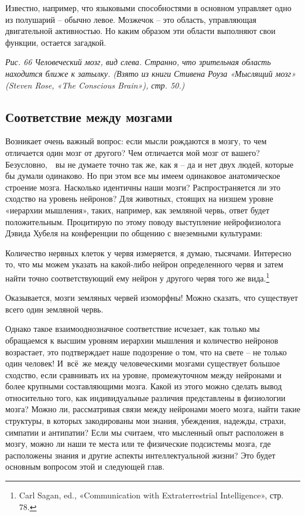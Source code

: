 \documentclass[../main.tex]{subfiles}
\begin{document}
Известно, например, что языковыми способностями в основном управляет одно из полушарий \--- обычно левое. Мозжечок \--- это область, управляющая двигательной активностью. Но каким образом эти области выполняют свои функции, остается загадкой.

\emph{Рис. 66 Человеческий мозг, вид слева. Странно, что зрительная область находится ближе к затылку. (Взято из книги Стивена Роуза «Мыслящий мозг» (Steven Rose, «The Conscious Brain»), стр. 50.)}


\subsection{Соответствие между мозгами}

Возникает очень важный вопрос: если мысли рождаются в мозгу, то чем отличается один мозг от другого? Чем отличается мой мозг от вашего? Безусловно,~~вы не думаете точно так же, как я \--- да и нет двух людей, которые бы думали одинаково. Но при этом все мы имеем одинаковое анатомическое строение мозга. Насколько идентичны наши мозги? Распространяется ли это сходство на уровень нейронов? Для животных, стоящих на низшем уровне «иерархии мышления», таких, например, как земляной червь, ответ будет положительным. Процитирую по этому поводу выступление нейрофизиолога Дэвида Хубеля на конференции по общению с внеземными культурами:

Количество нервных клеток у червя измеряется, я думаю, тысячами. Интересно то, что мы можем указать на какой-либо нейрон определенного червя и затем найти точно соответствующий ему нейрон у другого червя того же вида.\footnote{Carl Sagan, ed., «Communication with Extraterrestrial Intelligence», стр. 78.}

Оказывается, мозги земляных червей изоморфны! Можно сказать, что существует всего один земляной червь.

Однако такое взаимооднозначное соответствие исчезает, как только мы обращаемся к высшим уровням иерархии мышления и количество нейронов возрастает, это подтверждает наше подозрение о том, что на свете \--- не только один человек! И~всё~же между человеческими мозгами существует большое сходство, если сравнивать их на уровне, промежуточном между нейронами и более крупными составляющими мозга. Какой из этого можно сделать вывод относительно того, как индивидуальные различия представлены в физиологии мозга? Можно ли, рассматривая связи между нейронами моего мозга, найти такие структуры, в которых закодированы мои знания, убеждения, надежды, страхи, симпатии и антипатии? Если мы считаем, что мысленный опыт расположен в мозгу, можно ли наши те места или те физические подсистемы мозга, где расположены знания и другие аспекты интеллектуальной жизни? Это будет основным вопросом этой и следующей глав.
\end{document}
